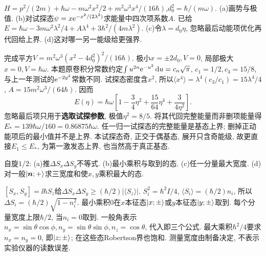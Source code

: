 \begin{exercise}
$H=p^2/(2m)+\hbar\omega-m\omega^2x^2/2+m^2\omega^3x^4/(16\hbar)$,$d_0^2=\hbar/(m\omega)$. (a)画势与极值. (b)对试探态$\psi=x\mathrm e^{-x^2/(2\lambda^2)}$求能量中四次项系数$A$. 已给$E=\hbar\omega-3m\omega^2\lambda^2/4+A\lambda^4+3\hbar^2/(4m\lambda^2)$. (c)令$\lambda=d_0\eta$, 忽略最后动能项优化再代回给上界. (d)这对哪一另一能级给更强界.
\end{exercise}
\begin{solution}
完成平方$V=m^2\omega^3(x^2-4d_0^2)^2/(16\hbar)$. 极小$x=\pm2d_0,V=0$, 局部极大$x=0,V=\hbar\omega$. 本题原卷积分常数约定$\int u^{2n}\mathrm e^{-u^2}\,\mathrm d u=c_n\sqrt\pi$, $c_1=1/2,c_3=15/8$, 与上一年测试的$\mathrm e^{-2y^2}$常数不同. 试探态密度含$x^2$, 所以$\langle x^4\rangle=\lambda^4(c_3/c_1)=15\lambda^4/4$, $A=15m^2\omega^3/(64\hbar)$. 因而
\[
E(\eta)=\hbar\omega\left[1-\frac34\eta^2+\frac{15}{64}\eta^4+\frac3{4\eta^2}\right].
\]
忽略最后项只用于\textbf{选取试探参数}, 极值$\eta^2=8/5$. 将其代回完整能量而非删项能量得$E_*=139\hbar\omega/160=0.86875\hbar\omega$. 任一归一试探态的完整能量是基态上界; 删掉正动能项后的最小值并不是上界. 本试探态奇, 正交于偶基态, 展开只含奇能级, 故更直接$E_1\leq E_*$, 为第一激发态上界, 也当然高于真正基态.
\begin{center}\end{center}
\end{solution}
\begin{exercise}
自旋$1/2$: (a)推$\Delta S_x\Delta S_y$不等式. (b)最小乘积与取到的态. (c)任一分量最大宽度. (d)对一般$\lvert \boldsymbol n;+\rangle$求三宽度和使$x,y$乘积最大的态.
\end{exercise}
\begin{solution}
$[S_x,S_y]=\ii\hbar S_z$给$\Delta S_x\Delta S_y\geq(\hbar/2)|\langle S_z\rangle|$. $S_i^2=\hbar^2I/4$, $\langle S_i\rangle=(\hbar/2)n_i$, 所以$\Delta S_i=(\hbar/2)\sqrt{1-n_i^2}$. 最小乘积0在$x$本征态$\lvert x;\pm\rangle$或$y$本征态$\lvert y;\pm\rangle$取到. 每个分量宽度上限$\hbar/2$, 当$n_i=0$取到. 一般角表示$n_x=\sin\theta\cos\phi,n_y=\sin\theta\sin\phi,n_z=\cos\theta$, 代入即三个公式. 最大乘积$\hbar^2/4$要求$n_x=n_y=0$, 即$\lvert z;\pm\rangle$; 在这些态Robertson界也饱和. 测量宽度由制备决定, 不表示实验仪器的读数误差.
\end{solution}
